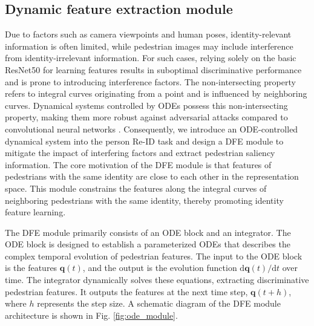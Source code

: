 \documentclass[12pt]{spieman}  %
\begin{document}
\begin{spacing}{2}
		\subsection{Dynamic feature extraction module}
		Due to factors such as camera viewpoints and human poses, identity-relevant information is often limited, while pedestrian images may include interference from identity-irrelevant information. For such cases, relying solely on the basic ResNet50 \cite{he2016deep} for learning features results in suboptimal discriminative performance and is prone to introducing interference factors. The non-intersecting property refers to integral curves originating from a point and is influenced by neighboring curves. Dynamical systems controlled by ODEs possess this non-intersecting property, making them more robust against adversarial attacks compared to convolutional neural networks \cite{chen2018neural, yan2019robustness}. Consequently, we introduce an ODE-controlled dynamical system into the person Re-ID task and design a DFE module to mitigate the impact of interfering factors and extract pedestrian saliency information. The core motivation of the DFE module is that features of pedestrians with the same identity are close to each other in the representation space. This module constrains the features along the integral curves of neighboring pedestrians with the same identity, thereby promoting identity feature learning.
		
		The DFE module primarily consists of an ODE block and an integrator. The ODE block is designed to establish a parameterized ODEs that describes the complex temporal evolution of pedestrian features. The input to the ODE block is the features $\boldsymbol{q}(t)$, and the output is the evolution function ${\mathrm{d}\boldsymbol{q}(t)}/{\mathrm{d}t}$ over time. The integrator dynamically solves these equations, extracting discriminative pedestrian features. It outputs the features at the next time step, $\boldsymbol{q}(t + h)$, where $h$ represents the step size. A schematic diagram of the DFE module architecture is shown in Fig. \ref{fig:ode_module}.
		

\end{spacing}
\end{document}
